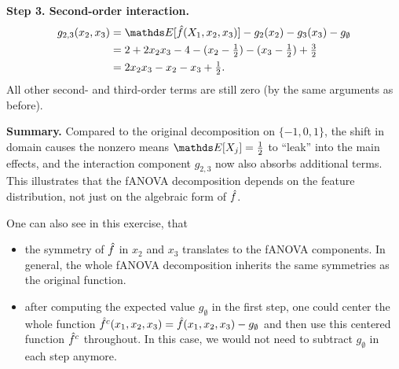 {\begin{enumerate}[a)]
\textbf{Step 3. Second-order interaction.}
\begin{align*}
g_{2,3}(x_2,x_3)
&= \E[\fh(X_1, x_2, x_3)] - g_2(x_2) - g_3(x_3) - g_\emptyset \\
&= 2 + 2x_2 x_3 - 4 - (x_2 - \tfrac12) - (x_3 - \tfrac12) + \tfrac32 \\
&= 2x_2 x_3 - x_2 - x_3 + \tfrac12.
\end{align*}
All other second- and third-order terms are still zero (by the same arguments as before).

\textbf{Summary.} Compared to the original decomposition on $\{-1,0,1\}$, the shift in domain causes the nonzero means $\E[X_j] = \tfrac12$ to ``leak'' into the main effects, and the interaction component $g_{2,3}$ now also absorbs additional terms. This illustrates that the fANOVA decomposition depends on the feature distribution, not just on the algebraic form of $\hat{f}$.

\end{enumerate}
One can also see in this exercise, that
\begin{itemize}
    \item the symmetry of $\hat{f}$ in $x_2$ and $x_3$ translates to the fANOVA components.
    In general, the whole fANOVA decomposition inherits the same symmetries as the original function.
    \item after computing the expected value $g_\emptyset$ in the first step, one could center the whole function $\hat{f}^c (x_1,x_2,x_3) = \hat{f}(x_1,x_2,x_3) - g_\emptyset$ and then use this centered function $\hat{f}^c$ throughout.
    In this case, we would not need to subtract $g_\emptyset$ in each step anymore.
\end{itemize}

}